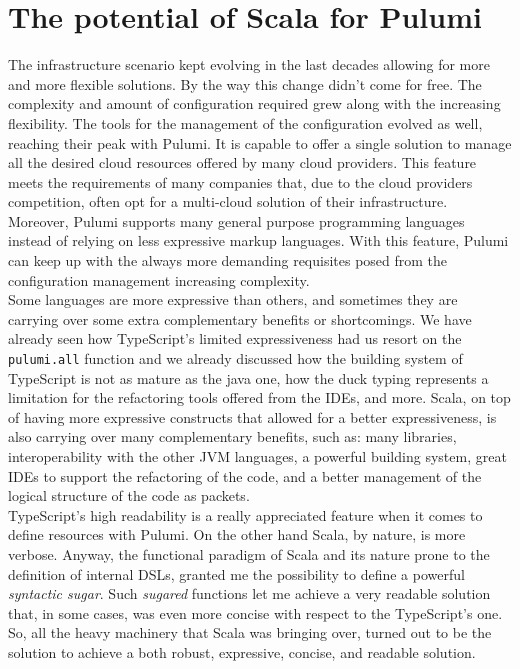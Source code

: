 \section{The potential of Scala for Pulumi}
The infrastructure scenario kept evolving in the last decades allowing for more and more flexible solutions.
By the way this change didn't come for free.
The complexity and amount of configuration required grew along with the increasing flexibility.
The tools for the management of the configuration evolved as well, reaching their peak with Pulumi.
It is capable to offer a single solution to manage all the desired cloud resources offered by many cloud providers.
This feature meets the requirements of many companies that, due to the cloud providers competition, often opt for a multi-cloud solution of their infrastructure.
Moreover, Pulumi supports many general purpose programming languages instead of relying on less expressive markup languages.
With this feature, Pulumi can keep up with the always more demanding requisites posed from the configuration management increasing complexity.\\
\newline
Some languages are more expressive than others, and sometimes they are carrying over some extra complementary benefits or shortcomings.
We have already seen how TypeScript's limited expressiveness had us resort on the \texttt{pulumi.all} function and we already discussed how the building system of TypeScript is not as mature as the java one, how the duck typing represents a limitation for the refactoring tools offered from the IDEs, and more.
Scala, on top of having more expressive constructs that allowed for a better expressiveness, is also carrying over many complementary benefits, such as: many libraries, interoperability with the other JVM languages, a powerful building system, great IDEs to support the refactoring of the code, and a better management of the logical structure of the code as packets.\\
TypeScript's high readability is a really appreciated feature when it comes to define resources with Pulumi.
On the other hand Scala, by nature, is more verbose.
Anyway, the functional paradigm of Scala and its nature prone to the definition of internal DSLs, granted me the possibility to define a powerful \textit{syntactic sugar}.
Such \textit{sugared} functions let me achieve a very readable solution that, in some cases, was even more concise with respect to the TypeScript's one.\\
So, all the heavy machinery that Scala was bringing over, turned out to be the solution to achieve a both robust, expressive, concise, and readable solution.\\
